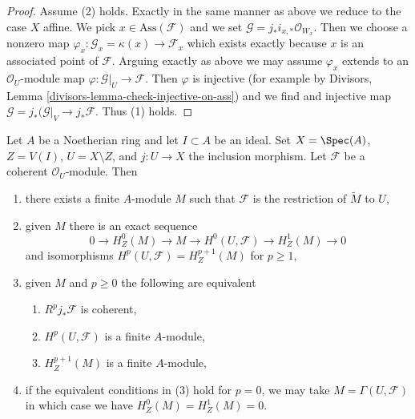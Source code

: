 \begin{proof}
\medskip\noindent
Assume (2) holds. Exactly in the same manner as above we reduce
to the case $X$ affine. We pick $x \in \text{Ass}(\mathcal{F})$
and we set $\mathcal{G} = j_*i_{x, *}\mathcal{O}_{W_x}$.
Then we choose a nonzero map
$\varphi_x : \mathcal{G}_x = \kappa(x) \to \mathcal{F}_x$
which exists exactly because $x$ is an associated point of $\mathcal{F}$.
Arguing exactly as above we may assume $\varphi_x$
extends to an $\mathcal{O}_U$-module map
$\varphi : \mathcal{G}|_U \to \mathcal{F}$.
Then $\varphi$ is injective (for example by
Divisors, Lemma \ref{divisors-lemma-check-injective-on-ass})
and we find and injective map
$\mathcal{G} = j_*(\mathcal{G}|_V \to j_*\mathcal{F}$.
Thus (1) holds.
\end{proof}

\begin{lemma}
\label{lemma-finiteness-pushforwards-and-H1-local}
Let $A$ be a Noetherian ring and let $I \subset A$ be an ideal.
Set $X = \Spec(A)$, $Z = V(I)$, $U = X \setminus Z$, and $j : U \to X$
the inclusion morphism. Let $\mathcal{F}$ be a coherent $\mathcal{O}_U$-module.
Then
\begin{enumerate}
\item there exists a finite $A$-module $M$ such that $\mathcal{F}$ is the
restriction of $\widetilde{M}$ to $U$,
\item given $M$ there is an exact sequence
$$
0 \to H^0_Z(M) \to M \to H^0(U, \mathcal{F}) \to H^1_Z(M) \to 0
$$
and isomorphisms $H^p(U, \mathcal{F}) = H^{p + 1}_Z(M)$ for $p \geq 1$,
\item given $M$ and $p \geq 0$ the following are equivalent
\begin{enumerate}
\item $R^pj_*\mathcal{F}$ is coherent,
\item $H^p(U, \mathcal{F})$ is a finite $A$-module,
\item $H^{p + 1}_Z(M)$ is a finite $A$-module,
\end{enumerate}
\item if the equivalent conditions in (3) hold for $p = 0$, we may take
$M = \Gamma(U, \mathcal{F})$ in which case we have $H^0_Z(M) = H^1_Z(M) = 0$.
\end{enumerate}
\end{lemma}

